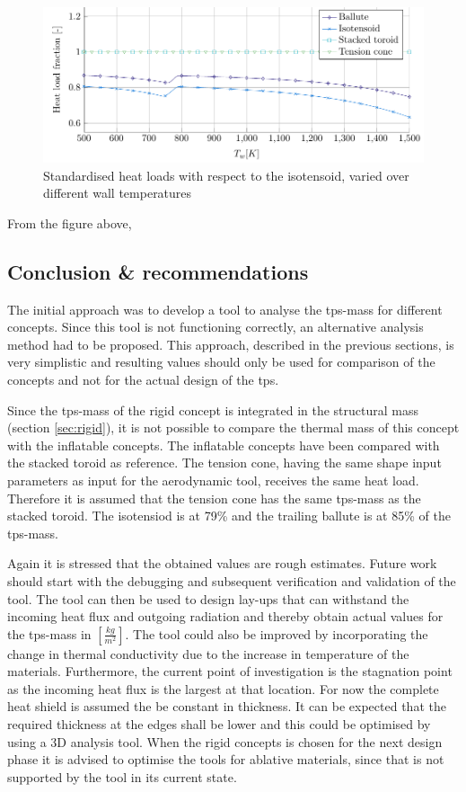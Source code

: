 \begin{figure}[H]
	\centering
	\includegraphics{Figure/heatload.pdf}
	\caption{Standardised heat loads with respect to the isotensoid, varied over different wall temperatures}
	\label{fig:heatload}
\end{figure}

From the figure above, 

\subsection{Conclusion \& recommendations}
The initial approach was to develop a tool to analyse the \gls{tps}-mass for different concepts. Since this tool is not functioning correctly, an alternative analysis method had to be proposed. This approach, described in the previous sections, is very simplistic and resulting values should only be used for comparison of the concepts and not for the actual design of the \gls{tps}.

Since the \gls{tps}-mass of the rigid concept is integrated in the structural mass (section \ref{sec:rigid}), it is not possible to compare the thermal mass of this concept with the inflatable concepts. The inflatable concepts have been compared with the stacked toroid as reference. The tension cone, having the same shape input parameters as input for the aerodynamic tool, receives the same heat load. Therefore it is assumed that the tension cone has the same \gls{tps}-mass as the stacked toroid. The isotensiod is at 79\% and the trailing ballute is at 85\% of the \gls{tps}-mass.

Again it is stressed that the obtained values are rough estimates. Future work should start with the debugging and subsequent verification and validation of the tool. The tool can then be used to design lay-ups that can withstand the incoming heat flux and outgoing radiation and thereby obtain actual values for the \gls{tps}-mass in $\left[\frac{kg}{m^2}\right]$. The tool could also be improved by incorporating the change in thermal conductivity due to the increase in temperature of the materials. Furthermore, the current point of investigation is the stagnation point as the incoming heat flux is the largest at that location. For now the complete heat shield is assumed the be constant in thickness. It can be expected that the required thickness at the edges shall be lower and this could be optimised by using a 3D analysis tool. When the rigid concepts is chosen for the next design phase it is advised to optimise the tools for ablative materials, since that is not supported by the tool in its current state.


